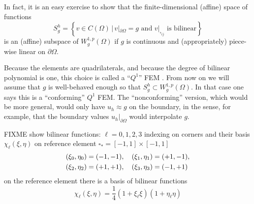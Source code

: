 In fact, it is an easy exercise to show that the finite-dimensional (affine) space of functions
\begin{equation}
S_g^h = \left\{v \in C(\Omega) \, \Big| \, v|_{\partial \Omega} = g \text{ and } v|_{\square_{ij}} \text{ is bilinear}\right\} \label{eq:of:Shdefn}
\end{equation}
is an (affine) subspace of $W_g^{1,p}(\Omega)$ if $g$ is continuous and (appropriately) piece-wise linear on $\partial\Omega$.

Because the elements are quadrilaterals, and because the degree of bilinear polynomial is one, this choice is called a  ``$Q^1$'' FEM \citep{Elmanetal2005}.  From now on we will assume that $g$ is well-behaved enough so that $S_g^h \subset W_g^{1,p}(\Omega)$.  In that case one says this is a ``conforming'' $Q^1$ FEM.  The ``nonconforming'' version, which would be more general, would only have $u_h \approx g$ on the boundary, in the sense, for example, that the boundary values $u_h|_{\partial \Omega}$ would interpolate $g$.

FIXME show bilinear functions: $\ell=0,1,2,3$ indexing on corners  and their basis $\chi_\ell(\xi,\eta)$ on reference element $\square_\ast = [-1,1]\times[-1,1]$
\begin{align}
(\xi_0,\eta_0) &= (-1,-1), \quad (\xi_1,\eta_1) = (+1,-1),    \label{eq:of:refcorners} \\
(\xi_2,\eta_2) &= (+1,+1), \quad (\xi_3,\eta_3) = (-1,+1) \notag
\end{align}
on the reference element there is a basis of bilinear functions
\begin{equation}
\chi_\ell(\xi,\eta) = \frac{1}{4} \left(1 + \xi_\ell \xi\right) \left(1 + \eta_\ell \eta\right)   \label{eq:of:chidefn}
\end{equation}

